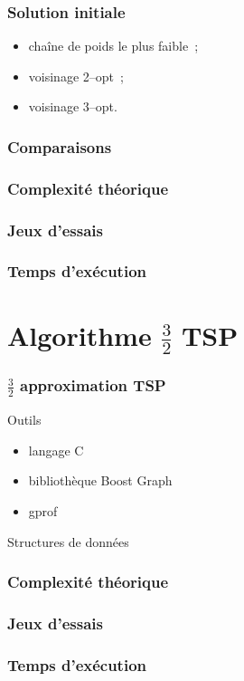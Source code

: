 \documentclass[french]{beamer}
\begin{document}
\begin{frame}
  \frametitle{Solution initiale}
  \begin{itemize}
  \item chaîne de poids le plus faible~;
  \item voisinage 2--opt~;
  \item voisinage 3--opt.
  \end{itemize}
\end{frame}


\begin{frame}
  \frametitle{Comparaisons}
\end{frame}

\begin{frame}
  \frametitle{Complexité théorique}
\end{frame}

\begin{frame}
  \frametitle{Jeux d'essais}
\end{frame}

\begin{frame}
  \frametitle{Temps d'exécution}
\end{frame}

\section{Algorithme $\frac{3}{2}$ TSP}

\begin{frame}
\frametitle{$\frac{3}{2}$ approximation TSP}
\begin{block}{Outils}
  \begin{itemize}
  \item langage C
  \item bibliothèque Boost Graph
  \item gprof
  \end{itemize}
\end{block}
\begin{block}{Structures de données}
\end{block}
\end{frame}

\begin{frame}
  \frametitle{Complexité théorique}
\end{frame}

\begin{frame}
  \frametitle{Jeux d'essais}
\end{frame}

\begin{frame}
  \frametitle{Temps d'exécution}
\end{frame}
\end{document}
